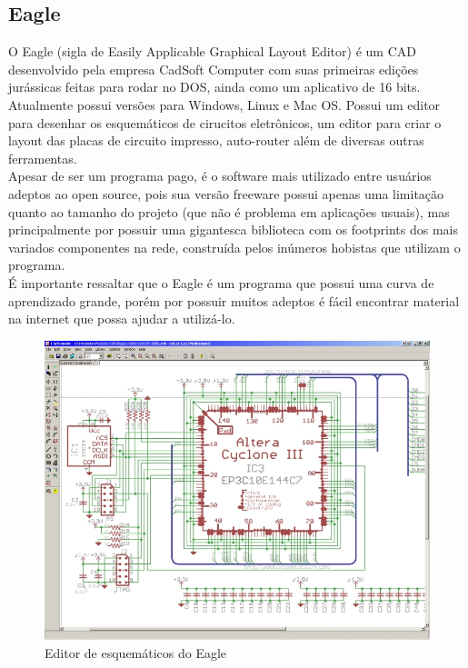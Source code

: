\subsection{Eagle}
O Eagle (sigla de Easily Applicable Graphical Layout Editor) \'e um CAD desenvolvido pela empresa CadSoft Computer com suas primeiras ediç\~oes jur\'assicas feitas para rodar no DOS, ainda como um aplicativo de 16 bits. Atualmente possui vers\~oes para Windows, Linux e Mac OS. Possui um editor para desenhar os esquem\'aticos de cirucitos eletr\^onicos, um editor para criar o layout das placas de circuito impresso, auto-router al\'em de diversas outras ferramentas.
\\Apesar de ser um programa pago, \'e o software mais utilizado entre usu\'arios adeptos ao open source, pois sua vers\~ao freeware possui apenas uma limitaç\~ao quanto ao tamanho do projeto (que n\~ao \'e problema em aplicaç\~oes usuais), mas principalmente por possuir uma gigantesca biblioteca com os footprints dos mais variados componentes na rede, constru\'ida pelos in\'umeros hobistas que utilizam o programa.
\\\'E importante ressaltar que o Eagle \'e um programa que possui uma curva de aprendizado grande, por\'em por possuir muitos adeptos \'e f\'acil encontrar material na internet que possa ajudar a utiliz\'a-lo.

\begin{figure}[htb]
\center
\includegraphics[width=1\textwidth]{./include/chapters/sections/hard/section1/img/Eagle_schem.jpg}
\caption{Editor de esquem\'aticos do Eagle}
\label{Eagle_schem}
\end{figure}


